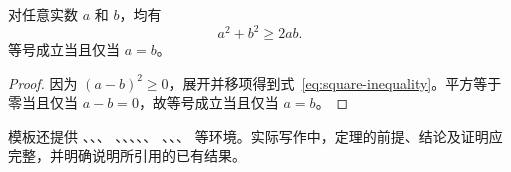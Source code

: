 \begin{theorem}
  对任意实数 $a$ 和 $b$，均有
  \begin{equation}
    a^2+b^2 \ge 2ab.
    \label{eq:square-inequality}
  \end{equation}
  等号成立当且仅当 $a=b$。
\end{theorem}
\begin{proof}
  因为 $(a-b)^2\ge 0$，展开并移项得到式~\eqref{eq:square-inequality}。平方等于零当且仅当 $a-b=0$，故等号成立当且仅当 $a=b$。
\end{proof}

模板还提供 、、、%
、、、、、
、、、 等环境。实际写作中，定理的前提、结论及证明应完整，并明确说明所引用的已有结果。
